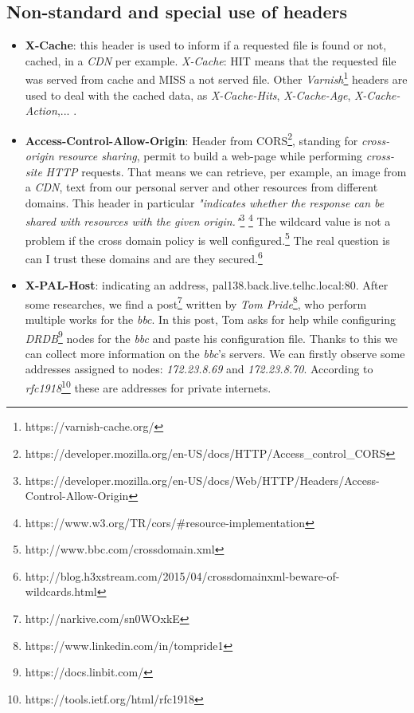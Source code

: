 \documentclass[conference]{IEEEtran}
\begin{document}
\subsection{Non-standard and special use of headers}
\begin{itemize} %

    \item \textbf{X-Cache}: this header is used to inform if a requested file is found or not, cached, in a \textit{CDN} per example. \textit{X-Cache}: HIT means that the requested file was served from cache and MISS a not served file. Other \textit{Varnish}\footnote{https://varnish-cache.org/} headers are used to deal with the cached data, as \textit{X-Cache-Hits}, \textit{X-Cache-Age}, \textit{X-Cache-Action},... . 
    
    \item \textbf{Access-Control-Allow-Origin}: 
    Header from CORS\footnote{https://developer.mozilla.org/en-US/docs/HTTP/Access\_control\_CORS}, standing for \textit{cross-origin resource sharing}, permit to build a web-page while performing \textit{cross-site} \textit{HTTP} requests. That means we can retrieve, per example, an image from a \textit{CDN}, text from our personal server and other resources from different domains. This header in particular \textit{"indicates whether the response can be shared with resources with the given origin."}\footnote{https://developer.mozilla.org/en-US/docs/Web/HTTP/Headers/Access-Control-Allow-Origin} \footnote{https://www.w3.org/TR/cors/\#resource-implementation} The wildcard value is not a problem if the cross domain policy is well configured.\footnote{http://www.bbc.com/crossdomain.xml} The real question is can I trust these domains and are they secured.\footnote{http://blog.h3xstream.com/2015/04/crossdomainxml-beware-of-wildcards.html} 
    
    \item \textbf{X-PAL-Host}: indicating an address, pal138.back.live.telhc.local:80. After some researches, we find a post\footnote{http://narkive.com/sn0WOxkE} written by \textit{Tom Pride}\footnote{https://www.linkedin.com/in/tompride1}, who perform multiple works for the \textit{bbc}. In this post, Tom asks for help while configuring \textit{DRDB}\footnote{https://docs.linbit.com/} nodes for the \textit{bbc} and paste his configuration file. Thanks to this we can collect more information on the \textit{bbc}'s servers. We can firstly observe some addresses assigned to nodes: \textit{172.23.8.69} and \textit{172.23.8.70}. According to \textit{rfc1918}\footnote{https://tools.ietf.org/html/rfc1918} these are addresses for private internets.
    

\end{itemize}
\end{document}
